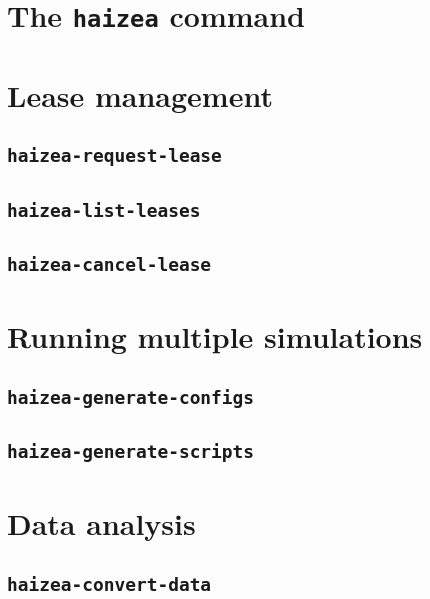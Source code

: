 \section{The \texttt{haizea} command}

\section{Lease management}

\subsection{\texttt{haizea-request-lease}}

\subsection{\texttt{haizea-list-leases}}

\subsection{\texttt{haizea-cancel-lease}}

\section{Running multiple simulations}

\subsection{\texttt{haizea-generate-configs}}

\subsection{\texttt{haizea-generate-scripts}}

\section{Data analysis}

\subsection{\texttt{haizea-convert-data}}
